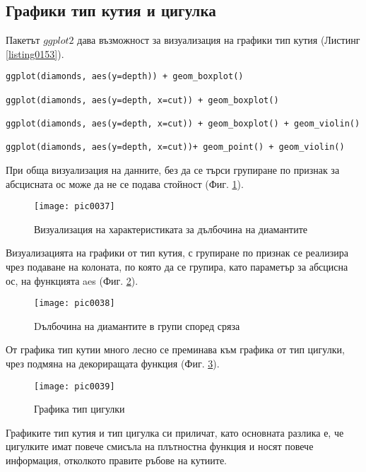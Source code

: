 \subsection{Графики тип кутия и цигулка}

Пакетът $ggplot2$ дава възможност за визуализация на графики тип кутия (Листинг \ref{listing0153}).

\begin{lstlisting}[caption=Визуализация тип кутия, label=listing0153]
ggplot(diamonds, aes(y=depth)) + geom_boxplot()

ggplot(diamonds, aes(y=depth, x=cut)) + geom_boxplot()

ggplot(diamonds, aes(y=depth, x=cut)) + geom_boxplot() + geom_violin()

ggplot(diamonds, aes(y=depth, x=cut))+ geom_point() + geom_violin()
\end{lstlisting}

При обща визуализация на данните, без да се търси групиране по признак за абсцисната ос може да не се подава стойност (Фиг. \ref{figure0037}). 

\begin{figure}[h!]
  \centering
  \texttt{[image: pic0037]}
  \caption{Визуализация на характеристиката за дълбочина на диамантите}
\label{figure0037}
\end{figure}
\FloatBarrier

Визуализацията на графики от тип кутия, с групиране по признак се реализира чрез подаване на колоната, по която да се групира, като параметър за абсцисна ос, на функцията aes (Фиг. \ref{figure0038}).

\begin{figure}[h!]
  \centering
  \texttt{[image: pic0038]}
  \caption{Dълбочина на диамантите в групи според сряза}
\label{figure0038}
\end{figure}
\FloatBarrier

От графика тип кутии много лесно се преминава към графика от тип цигулки, чрез подмяна на декориращата функция (Фиг. \ref{figure0039}).

\begin{figure}[h!]
  \centering
  \texttt{[image: pic0039]}
  \caption{Графика тип цигулки}
\label{figure0039}
\end{figure}
\FloatBarrier

Графиките тип кутия и тип цигулка си приличат, като основната разлика е, че цигулките имат повече смисъла на плътностна функция и носят повече информация, отколкото правите ръбове на кутиите. 

